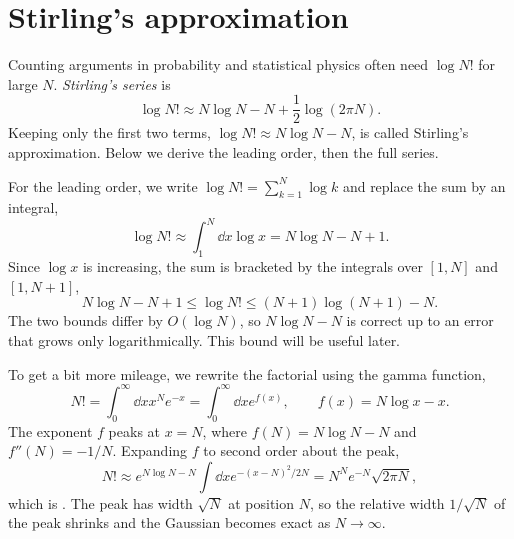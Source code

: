 \section{Stirling's approximation}\label{sec:stirling}

Counting arguments in probability and statistical physics often need $\log N!$
for large $N$. {\it Stirling's series} is
\begin{equation}\label{eq:stirlingSeries}
  \log N!\approx N\log N - N + \frac12\log(2\pi N). 
\end{equation}
Keeping only the first two terms, $\log N!\approx N\log N-N$, is called
Stirling's approximation. Below we derive the leading order, then the full
series. 

For the leading order, we
write $\log N!=\sum_{k=1}^N\log k$ and replace the sum by an integral,
\begin{equation}
  \log N! \approx \int_1^N \dd{x}\log x = N\log N - N + 1 .
\end{equation}
Since $\log x$ is increasing, the sum is bracketed by the integrals over
$[1,N]$ and $[1,N+1]$,
\begin{equation}\label{eq:stirlingBounds}
  N\log N - N + 1 \le \log N! \le (N+1)\log(N+1) - N .
\end{equation}
The two bounds differ by $O(\log N)$, so $N\log N-N$ is correct up to an error
that grows only logarithmically. This bound will be useful later.

To get a bit more mileage, we rewrite the factorial using the gamma function,
\begin{equation}
  N! = \int_0^\infty \dd{x} x^N e^{-x} = \int_0^\infty \dd{x} e^{f(x)},
  \qquad f(x) = N\log x - x .
\end{equation}
The exponent $f$ peaks at $x=N$, where $f(N)=N\log N-N$ and $f''(N)=-1/N$.
Expanding $f$ to second order about the peak,
\begin{equation}
  N! \approx e^{N\log N-N}\int \dd{x} e^{-(x-N)^2/2N} = N^N e^{-N}\sqrt{2\pi N},
\end{equation}
which is . The peak has width $\sqrt N$ at position
$N$, so the relative width $1/\sqrt N$ of the peak shrinks and the Gaussian
becomes exact as $N\to\infty$. 

